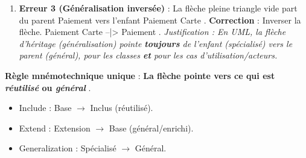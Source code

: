 \documentclass[11pt]{article}
\begin{document}
\begin{exoresolu}
\begin{enumerate}
    \item \textbf{Erreur 3 (Généralisation inversée)} : La flèche pleine triangle vide part du parent \guillemotleft Paiement \guillemotright vers l'enfant \guillemotleft Paiement Carte \guillemotright.
    \textbf{Correction} : Inverser la flèche. \guillemotleft Paiement Carte \guillemotright --|> \guillemotleft Paiement \guillemotright. \textit{Justification : En UML, la flèche d'héritage (généralisation) pointe \textbf{toujours} de l'enfant (spécialisé) vers le parent (général), pour les classes \textbf{et} pour les cas d'utilisation/acteurs.}
\end{enumerate}
\textbf{Règle mnémotechnique unique} : \guillemotleft \textbf{La flèche pointe vers ce qui est \emph{réutilisé} ou \emph{général}} \guillemotright.
\begin{itemize}
    \item Include : Base $\rightarrow$ Inclus (réutilisé).
    \item Extend : Extension $\rightarrow$ Base (général/enrichi).
    \item Generalization : Spécialisé $\rightarrow$ Général.
\end{itemize}
\end{exoresolu}
\end{document}
